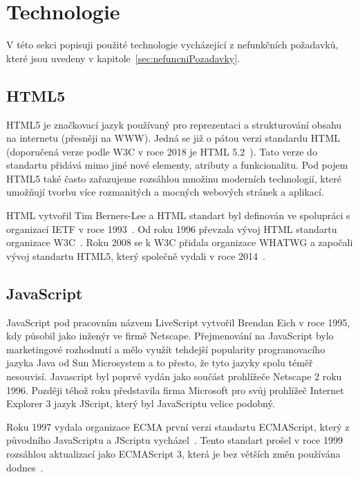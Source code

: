 
\section{Technologie}\label{sec:technologie}
V této sekci popisuji použité technologie vycházející z nefunkčních požadavků, které jsou uvedeny v kapitole~\ref{sec:nefuncniPozadavky}.

\subsection{HTML5}\label{subsec:html5}

HTML5 je značkovací jazyk používaný pro reprezentaci a strukturování  obsahu na internetu (přesněji na \gls{WWW}).
Jedná se již o pátou verzi standardu \gls{HTML} (doporučená verze podle \gls{W3C} v roce 2018 je HTML 5.2~\cite{w3c:html52}).
Tato verze do standartu přidává mimo jiné nové elementy, atributy a funkcionalitu.
Pod pojem HTML5 také často zařazujeme rozsáhlou množinu moderních technologií, které umožňují tvorbu více rozmanitých a mocných webových stránek a aplikací.~\cite{mozzila:html5}

\gls{HTML} vytvořil Tim Berners-Lee a \gls{HTML} standart byl definován ve spolupráci s organizací \gls{IETF} v roce 1993~\cite{html:autor}.
Od roku 1996 převzala vývoj \gls{HTML} standartu organizace \gls{W3C}~\cite{w3c:html32}.
Roku 2008 se k \gls{W3C} přidala organizace \gls{WHATWG} a započali vývoj standartu HTML5, který společně vydali v roce 2014~\cite{w3c:html5}.


\subsection{JavaScript}\label{subsec:javascript}

JavaScript pod pracovním názvem LiveScript vytvořil Brendan Eich v roce 1995, kdy působil jako inženýr ve firmě Netscape.
Přejmenování na JavaScript bylo marketingové rozhodnutí a mělo využít tehdejší popularity programovacího jazyka Java od Sun Microsystem a to přesto, že tyto jazyky spolu téměř nesouvisí.
Javascript byl poprvé vydán jako součást prohlížeče Netscape 2 roku 1996.
Později téhož roku představila firma Microsoft pro svůj prohlížeč Internet Explorer 3 jazyk JScript, který byl JavaScriptu velice podobný.~\cite{mozzila:javascript}

Roku 1997 vydala organizace \gls{ECMA} první verzi standartu ECMAScript, který z původního JavaScriptu a JScriptu vycházel~\cite{ecma:ecmascript1}.
Tento standart prošel v roce 1999 rozsáhlou aktualizací jako ECMAScript 3, která je bez větších změn používána dodnes~\cite{mozzila:javascript}.

